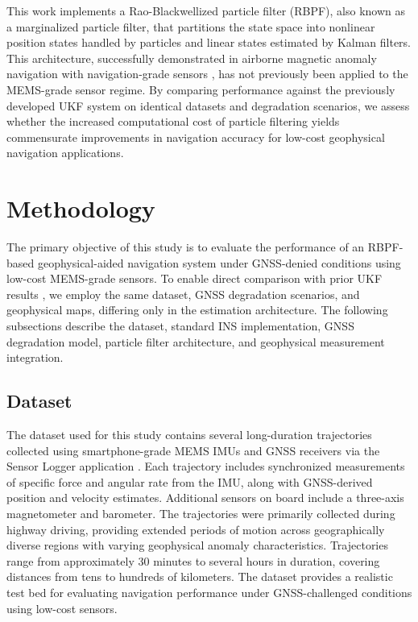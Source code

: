 \documentclass[letterpaper,times]{IONconf}
\begin{document}
This work implements a Rao-Blackwellized particle filter (RBPF), also known as a marginalized particle filter, that partitions the state space into nonlinear position states handled by particles and linear states estimated by Kalman filters. This architecture, successfully demonstrated in airborne magnetic anomaly navigation with navigation-grade sensors \citep{canciani2017airborne}, has not previously been applied to the MEMS-grade sensor regime. By comparing performance against the previously developed UKF system on identical datasets and degradation scenarios, we assess whether the increased computational cost of particle filtering yields commensurate improvements in navigation accuracy for low-cost geophysical navigation applications.

\section{Methodology}

The primary objective of this study is to evaluate the performance of an RBPF-based geophysical-aided navigation system under GNSS-denied conditions using low-cost MEMS-grade sensors. To enable direct comparison with prior UKF results \citep{brodovsky2026anomaly_ukf}, we employ the same dataset, GNSS degradation scenarios, and geophysical maps, differing only in the estimation architecture. The following subsections describe the dataset, standard INS implementation, GNSS degradation model, particle filter architecture, and geophysical measurement integration.

\subsection{Dataset}

The dataset used for this study \citep{mems-nav-dataset} contains several long-duration trajectories collected using smartphone-grade MEMS IMUs and GNSS receivers via the Sensor Logger application \citep{awesome-sensor-logger}. Each trajectory includes synchronized measurements of specific force and angular rate from the IMU, along with GNSS-derived position and velocity estimates. Additional sensors on board include a three-axis magnetometer and barometer. The trajectories were primarily collected during highway driving, providing extended periods of motion across geographically diverse regions with varying geophysical anomaly characteristics. Trajectories range from approximately 30 minutes to several hours in duration, covering distances from tens to hundreds of kilometers. The dataset provides a realistic test bed for evaluating navigation performance under GNSS-challenged conditions using low-cost sensors.
\end{document}
